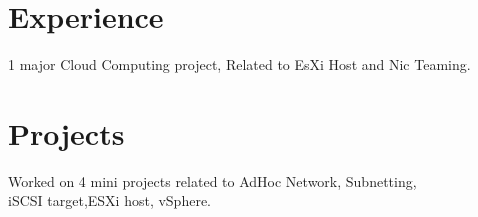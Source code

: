 \documentclass[]{deedy-resume-openfont}
\begin{document}
\begin{minipage}[t]{0.66\textwidth} 


\section{Experience}


{\href{http://tmsindia.co.in/}{}}
\vspace{\topsep} %
\begin{tightemize}
\item 1 major Cloud Computing project, Related to EsXi Host and Nic Teaming.
\end{tightemize}
\sectionsep



\section{Projects}
\begin{tightemize}
\item Worked on 4 mini projects related to AdHoc Network, Subnetting, \\
iSCSI target,ESXi host, vSphere.
\end{tightemize}
\sectionsep




\end{minipage}
\end{document}
